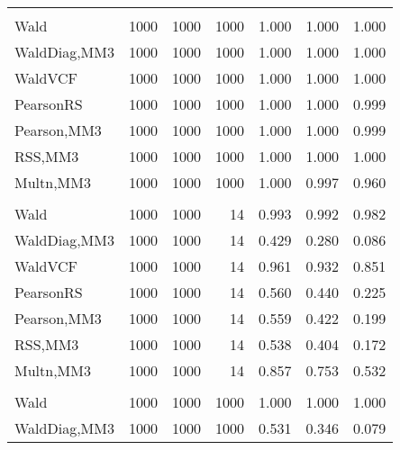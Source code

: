 \documentclass[
]{article}
\begin{document}
\begin{table}[H]
{\begin{tabular}[t]{lrrrrrr}
\addlinespace[0.3em]
\multicolumn{7}{l}{\textbf{1F 15V}}\\
\hspace{1em}Wald & 1000 & 1000 & 1000 & 1.000 & 1.000 & \vphantom{1} 1.000\\
\hspace{1em}WaldDiag,MM3 & 1000 & 1000 & 1000 & 1.000 & 1.000 & 1.000\\
\hspace{1em}WaldVCF & 1000 & 1000 & 1000 & 1.000 & 1.000 & \vphantom{1} 1.000\\
\hspace{1em}PearsonRS & 1000 & 1000 & 1000 & 1.000 & 1.000 & 0.999\\
\hspace{1em}Pearson,MM3 & 1000 & 1000 & 1000 & 1.000 & 1.000 & 0.999\\
\hspace{1em}RSS,MM3 & 1000 & 1000 & 1000 & 1.000 & 1.000 & 1.000\\
\hspace{1em}Multn,MM3 & 1000 & 1000 & 1000 & 1.000 & 0.997 & 0.960\\
\addlinespace[0.3em]
\multicolumn{7}{l}{\textbf{2F 10V}}\\
\hspace{1em}Wald & 1000 & 1000 & 14 & 0.993 & 0.992 & 0.982\\
\hspace{1em}WaldDiag,MM3 & 1000 & 1000 & 14 & 0.429 & 0.280 & 0.086\\
\hspace{1em}WaldVCF & 1000 & 1000 & 14 & 0.961 & 0.932 & 0.851\\
\hspace{1em}PearsonRS & 1000 & 1000 & 14 & 0.560 & 0.440 & 0.225\\
\hspace{1em}Pearson,MM3 & 1000 & 1000 & 14 & 0.559 & 0.422 & 0.199\\
\hspace{1em}RSS,MM3 & 1000 & 1000 & 14 & 0.538 & 0.404 & 0.172\\
\hspace{1em}Multn,MM3 & 1000 & 1000 & 14 & 0.857 & 0.753 & 0.532\\
\addlinespace[0.3em]
\multicolumn{7}{l}{\textbf{3F 15V}}\\
\hspace{1em}Wald & 1000 & 1000 & 1000 & 1.000 & 1.000 & 1.000\\
\hspace{1em}WaldDiag,MM3 & 1000 & 1000 & 1000 & 0.531 & 0.346 & 0.079\\

\end{tabular}}
\end{table}
\end{document}
